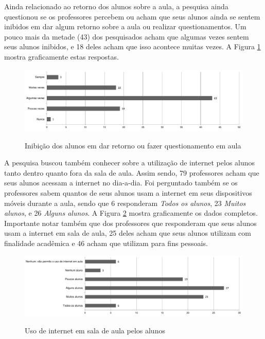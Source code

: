 Ainda relacionado ao retorno dos alunos sobre a aula, a pesquisa ainda questionou se os professores percebem ou acham que seus alunos ainda se sentem inibidos em dar algum retorno sobre a aula ou realizar questionamentos. Um pouco mais da metade (43) dos pesquisados acham que algumas vezes sentem seus alunos inibidos, e 18 deles acham que isso acontece muitas vezes. A Figura \ref{fig:grafico_inibicao} mostra graficamente estas respostas.

\begin{figure}
\centering
\caption{Inibição dos alunos em dar retorno ou fazer questionamento em aula }
\includegraphics[width=1.0\textwidth]{pdfs/professores/img-grafico-inibicao.pdf} 
\label{fig:grafico_inibicao} 
\end{figure}



A pesquisa buscou também conhecer sobre a utilização de internet pelos alunos tanto dentro quanto fora da sala de aula. Assim sendo, 79 professores acham que seus alunos acessam a internet no dia-a-dia. Foi perguntado também se os professores sabem quantos de seus alunos usam a internet em seus dispositivos móveis durante a aula, sendo que 6 responderam \emph{Todos os alunos}, 23 \emph{Muitos alunos}, e 26 \emph{Alguns alunos}. A Figura \ref{fig:grafico_internet_sala} mostra graficamente os dados completos. Importante notar também que dos professores que responderam que seus alunos usam a internet em sala de aula, 25 deles acham que seus alunos utilizam com finalidade acadêmica e 46 acham que utilizam para fins pessoais.

\begin{figure}
\centering
\caption{Uso de internet em sala de aula pelos alunos}
\includegraphics[width=1.0\textwidth]{pdfs/alunos-professores/pesquisa-uso-internet-sala.pdf} 
\label{fig:grafico_internet_sala} 
\end{figure}

